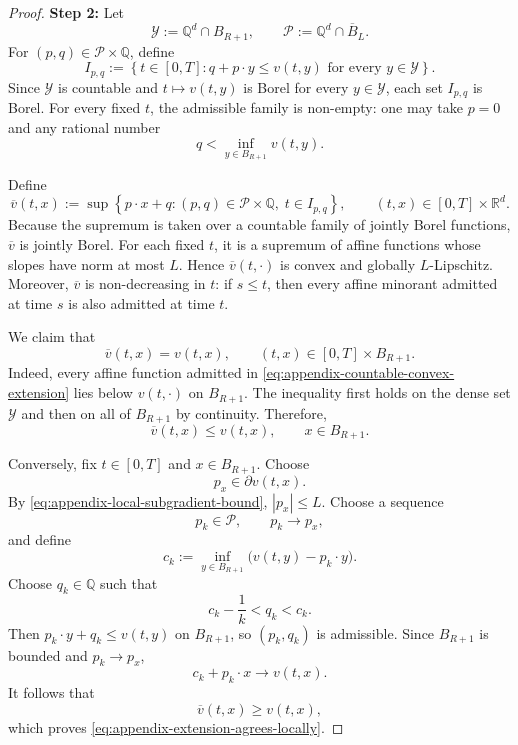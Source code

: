\documentclass[12pt,oneside, reqno]{amsart}
\numberwithin{equation}{section}
\begin{document}
\begin{proof}
	
		\textbf{Step 2:}
		Let
		\[
		\mathcal Y:=\mathbb Q^d\cap B_{R+1},
		\qquad
		\mathcal P:=\mathbb Q^d\cap \overline B_L.
		\]
		For $(p,q)\in\mathcal P\times\mathbb Q$, define
		\[
		I_{p,q}
		:=
		\left\{
		t\in[0,T]:
		q+p\cdot y\leq v(t,y)
		\text{ for every }y\in\mathcal Y
		\right\}.
		\]
		Since $\mathcal Y$ is countable and
		$t\mapsto v(t,y)$ is Borel for every $y\in\mathcal Y$,
		each set $I_{p,q}$ is Borel. For every fixed $t$, the admissible
		family is non-empty: one may take $p=0$ and any rational number
		\[
		q<\inf_{y\in B_{R+1}}v(t,y).
		\]
		
		Define
		\begin{equation}
			\label{eq:appendix-countable-convex-extension}
			\overline v(t,x)
			:=
			\sup
			\left\{
			p\cdot x+q:
			(p,q)\in\mathcal P\times\mathbb Q,\;
			t\in I_{p,q}
			\right\},
			\qquad
			(t,x)\in[0,T]\times\mathbb R^d.
		\end{equation}
		Because the supremum is taken over a countable family of jointly
		Borel functions, $\overline v$ is jointly Borel. For each fixed
		$t$, it is a supremum of affine functions whose slopes have norm at
		most $L$. Hence $\overline v(t,\cdot)$ is convex and globally
		$L$-Lipschitz. Moreover, $\overline v$ is non-decreasing in $t$:
		if $s\leq t$, then every affine minorant admitted at time $s$ is also
		admitted at time $t$.
		
		We claim that
		\begin{equation}
			\label{eq:appendix-extension-agrees-locally}
			\overline v(t,x)=v(t,x),
			\qquad
			(t,x)\in[0,T]\times B_{R+1}.
		\end{equation}
		Indeed, every affine function admitted in
		\eqref{eq:appendix-countable-convex-extension} lies below
		$v(t,\cdot)$ on $B_{R+1}$. The inequality first holds on the dense
		set $\mathcal Y$ and then on all of $B_{R+1}$ by continuity.
		Therefore,
		\[
		\overline v(t,x)\leq v(t,x),
		\qquad x\in B_{R+1}.
		\]
		
		Conversely, fix $t\in[0,T]$ and $x\in B_{R+1}$. Choose
		\[
		p_x\in\partial v(t,x).
		\]
		By \eqref{eq:appendix-local-subgradient-bound},
		$|p_x|\leq L$. Choose a sequence
		\[
		p_k\in\mathcal P,
		\qquad
		p_k\longrightarrow p_x,
		\]
		and define
		\[
		c_k
		:=
		\inf_{y\in B_{R+1}}
		\bigl(v(t,y)-p_k\cdot y\bigr).
		\]
		Choose $q_k\in\mathbb Q$ such that
		\[
		c_k-\frac1k<q_k<c_k.
		\]
		Then $p_k\cdot y+q_k\leq v(t,y)$ on $B_{R+1}$, so
		$(p_k,q_k)$ is admissible. Since $B_{R+1}$ is bounded and
		$p_k\to p_x$,
		\[
		c_k+p_k\cdot x
		\longrightarrow
		v(t,x).
		\]
		It follows that
		\[
		\overline v(t,x)\geq v(t,x),
		\]
		which proves \eqref{eq:appendix-extension-agrees-locally}.
		

\end{proof}
\end{document}
